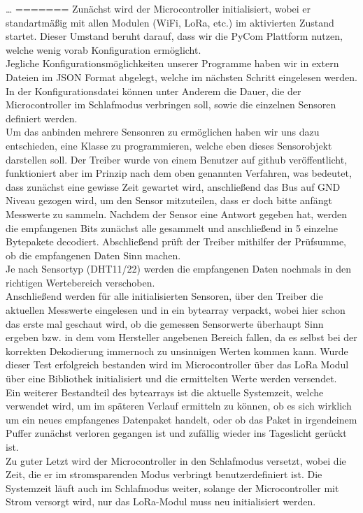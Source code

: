 \ldots
=======
Zunächst wird der Microcontroller initialisiert, wobei er standartmäßig mit allen Modulen (WiFi, LoRa, etc.) im aktivierten Zustand startet. Dieser Umstand beruht darauf, dass wir die PyCom Plattform nutzen, welche wenig vorab Konfiguration ermöglicht.\\
Jegliche Konfigurationsmöglichkeiten unserer Programme haben wir in extern Dateien im JSON Format abgelegt, welche im nächsten Schritt eingelesen werden. In der Konfigurationsdatei können unter Anderem die Dauer, die der Microcontroller im Schlafmodus verbringen soll, sowie die einzelnen Sensoren definiert werden.\\
Um das anbinden mehrere Sensonren zu ermöglichen haben wir uns dazu entschieden, eine Klasse zu programmieren, welche eben dieses Sensorobjekt darstellen soll. Der Treiber wurde von einem Benutzer auf github veröffentlicht, funktioniert aber im Prinzip nach dem oben genannten Verfahren, was bedeutet, dass zunächst eine gewisse Zeit gewartet wird, anschließend das Bus auf GND Niveau gezogen wird, um den Sensor mitzuteilen, dass er doch bitte anfängt Messwerte zu sammeln. Nachdem der Sensor eine Antwort gegeben hat, werden die empfangenen Bits zunächst alle gesammelt und anschließend in 5 einzelne Bytepakete decodiert. Abschließend prüft der Treiber mithilfer der Prüfsumme, ob die empfangenen Daten Sinn machen.\\ Je nach Sensortyp (DHT11/22) werden die empfangenen Daten nochmals in den richtigen Wertebereich \grqq verschoben\grqq.\\
Anschließend werden für alle initialisierten Sensoren, über den Treiber die aktuellen Messwerte eingelesen und in ein bytearray verpackt, wobei hier schon das erste mal geschaut wird, ob die gemessen Sensorwerte überhaupt Sinn ergeben bzw. in dem vom Hersteller angebenen Bereich fallen, da es selbst bei der korrekten Dekodierung immernoch zu unsinnigen Werten kommen kann. 
Wurde dieser Test erfolgreich bestanden wird im Microcontroller über das LoRa Modul über eine Bibliothek initialisiert und die ermittelten Werte werden versendet.\\ Ein weiterer Bestandteil des bytearrays ist die aktuelle Systemzeit, welche verwendet wird, um im späteren Verlauf ermitteln zu können, ob es sich wirklich um ein neues empfangenes Datenpaket handelt, oder ob das Paket in irgendeinem Puffer zunächst verloren gegangen ist und zufällig wieder ins Tageslicht gerückt ist.\\
Zu guter Letzt wird der Microcontroller in den Schlafmodus versetzt, wobei die Zeit, die er im stromsparenden Modus verbringt benutzerdefiniert ist. Die Systemzeit läuft auch im Schlafmodus weiter, solange der Microcontroller mit Strom versorgt wird, nur das LoRa-Modul muss neu initialisiert werden.\\

